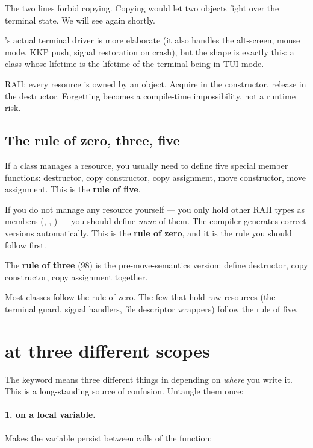 The two  lines forbid copying. Copying would let two
 objects fight over the terminal state. We will
see  again shortly.

\maya{}'s actual terminal driver is more elaborate (it also handles
the alt-screen, mouse mode, KKP push, signal restoration on crash),
but the shape is exactly this: a class whose lifetime is the
lifetime of the terminal being in TUI mode.

\begin{idea}
RAII: every resource is owned by an object. Acquire in the
constructor, release in the destructor. Forgetting becomes a
compile-time impossibility, not a runtime risk.
\end{idea}

\subsection{The rule of zero, three, five}

If a class manages a resource, you usually need to define five
special member functions: destructor, copy constructor, copy
assignment, move constructor, move assignment. This is the
\textbf{rule of five}.

If you do not manage any resource yourself --- you only hold other
RAII types as members (, ,
) --- you should define \emph{none} of them.
The compiler generates correct versions automatically. This is the
\textbf{rule of zero}, and it is the rule you should follow first.

The \textbf{rule of three} (\cpp{}98) is the pre-move-semantics
version: define destructor, copy constructor, copy assignment
together.

Most \maya{} classes follow the rule of zero. The few that hold raw
resources (the terminal guard, signal handlers, file descriptor
wrappers) follow the rule of five.

\section{ at three different scopes}
\label{sec:cpp:static}

The keyword  means three different things in \cpp{}
depending on \emph{where} you write it. This is a long-standing
source of confusion. Untangle them once:

\paragraph{1.  on a local variable.}
Makes the variable persist between calls of the function:

